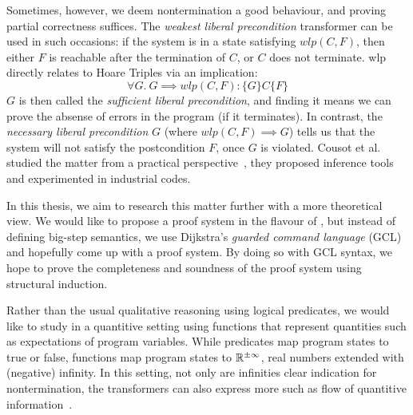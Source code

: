 \documentclass[adraft,hidelinks]{eptcs}
\begin{document}
Sometimes, however, we deem nontermination a good behaviour, and proving partial correctness suffices. 
The \textit{weakest liberal precondition} transformer \cite{Dijkstra1990} can be used in such occasions: 
if the system is in a state satisfying $wlp(C,F)$, then either $F$ is reachable after the termination of $C$, or $C$ does not terminate.
wlp directly relates to Hoare Triples via an implication: 
\[\forall G.\ G\implies wlp(C,F): \{G\} C \{F\}\]
$G$ is then called the \textit{sufficient liberal precondition}, and finding it means we can prove the absense of errors in the program (if it terminates). 
In contrast, the \textit{necessary liberal precondition} $G$ (where $ wlp(C,F)\implies G$) tells us that the system will not satisfy the postcondition $F$, once $G$ is violated. 
Cousot et al. studied the matter from a practical perspective~\cite{Cousot2013}, they proposed inference tools and experimented in industrial codes.

In this thesis, we aim to research this matter further with a more theoretical view. 
We would like to propose a proof system in the flavour of \cite{Vries2011}, but instead of defining big-step semantics, we use Dijkstra's \textit{guarded command language} (GCL)~\cite{Dijkstra1975} and hopefully come up with a proof system. 
By doing so with GCL syntax, we hope to prove the completeness and soundness of the proof system using structural induction. 

Rather than the usual qualitative reasoning using logical predicates, we would like to study in a quantitive setting using functions that represent quantities such as expectations of program variables. 
While predicates map program states to true or false, functions map program states to $\mathbb{R}^{\pm\infty}$, real numbers extended with (negative) infinity. 
In this setting, not only are infinities clear indication for nontermination, the transformers can also express more such as flow of quantitive information~\cite{Zhang2022}.








\end{document}
